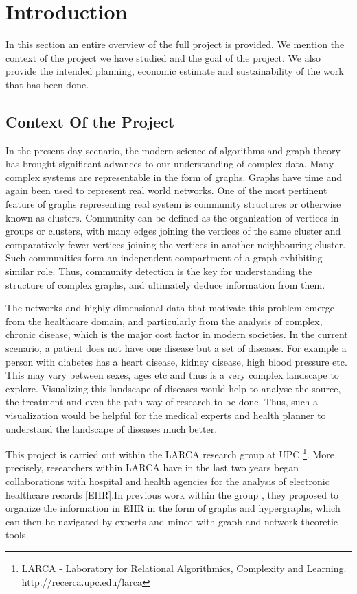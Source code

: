 \newpage

\tableofcontents
\newpage

\chapter{Introduction}

\setcounter{page}{1}
\par In this section an entire overview of the full project is provided. We mention the context of the project we have studied and the goal of the project. We also provide the intended planning, economic estimate and sustainability of the work that has been done.


\section{Context Of the Project}
\par In the present day scenario, the modern science of algorithms and graph theory has brought significant advances to our understanding of complex data. Many complex systems are representable in the form of graphs. Graphs have time and again been used to represent real world networks. One of the most pertinent feature of graphs representing real system is community structures or otherwise known as clusters. Community can be defined as the organization of vertices in groups or clusters, with many edges joining the vertices of the same cluster and comparatively fewer vertices joining the vertices in another neighbouring cluster. Such communities form an independent compartment of a graph exhibiting similar role.
Thus, community detection is the key for understanding the structure of complex graphs, and ultimately deduce information from them.

\par The networks and highly dimensional data that motivate this problem emerge from the healthcare domain, and particularly from the analysis of complex, chronic disease, which is the major cost factor in modern societies. In the current scenario, a patient does not have one disease but a
set of diseases. For example a person with diabetes has a heart disease, kidney disease, high blood
pressure etc. This may vary between sexes, ages etc and thus is a very complex landscape to
explore. Visualizing this landscape of diseases would help to analyse the source, the treatment
and even the path way of research to be done. Thus, such a visualization would be helpful for the
medical experts and health planner to understand the landscape of diseases much better.
\par This project is carried out within the LARCA research group at UPC \footnote{LARCA - Laboratory for Relational Algorithmics, Complexity and Learning. http://recerca.upc.edu/larca}. More precisely, researchers within LARCA have in the last two years began collaborations with hospital and health agencies for the analysis of electronic healthcare records [EHR].In previous work within the group \cite{sirlarca}, they proposed to organize the information in EHR in the form of graphs and hypergraphs, which can then be navigated by experts and mined with graph and network theoretic tools. 

